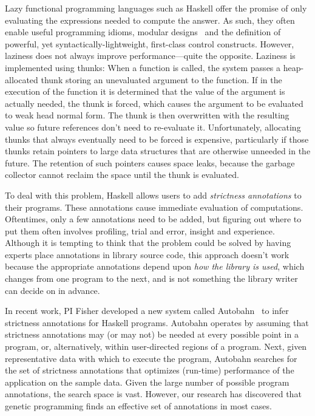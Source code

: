 Lazy functional programming languages such as
Haskell offer the promise of only evaluating the expressions needed
to compute the answer. As such, they often enable useful programming
idioms, modular designs~\cite{Hughes89} and the definition of powerful,
yet syntactically-lightweight, first-class control constructs.
However, laziness does not always improve performance---quite the
opposite.  Laziness is implemented using thunks: When a function is called, the
system passes a heap-allocated thunk storing an unevaluated argument to
the function. If in the execution of the function it is determined that
the value of the argument is actually needed, the thunk is forced,
which causes the argument to be evaluated to weak head normal
form. The thunk is then overwritten with the resulting value so future
references don't need to re-evaluate it.  Unfortunately,
allocating thunks that always eventually need to be forced is expensive,
particularly if those thunks retain pointers to large data structures
that are otherwise unneeded in the future.  The retention of such
pointers causes space leaks, because the garbage collector cannot
reclaim the space until the thunk is evaluated.

To deal with this problem, Haskell allows users to add
\emph{strictness annotations} to their programs.  These annotations
cause immediate evaluation of computations. Oftentimes, only a few
annotations need to be added, but figuring out where to put them often
involves profiling, trial and error, insight and experience.  Although
it is tempting to think that the problem could be solved by having
experts place annotations in library source code, this approach
doesn't work because the appropriate annotations depend upon
\textit{how the library is used}, which changes from one program to
the next, and is not something the library writer can decide on in
advance.

In recent work, PI Fisher developed a new system called Autobahn~\cite{autobahn}
to infer strictness annotations for Haskell programs.  Autobahn
operates by assuming that strictness annotations may (or may not) be
needed at every possible point in a program, or, alternatively, within
user-directed regions of a program.  Next, given representative data with which to
execute the program, Autobahn searches for the set of strictness annotations
that optimizes (run-time) performance of the application on the sample data.
Given the large number of possible program annotations, the search space is
vast.  However, our research has discovered that genetic programming finds
an effective set of annotations in most cases.


